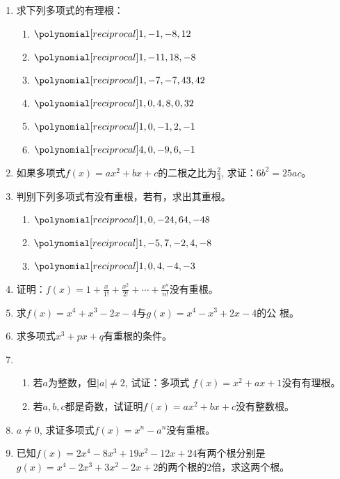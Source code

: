 \begin{enumerate}
    \item 求下列多项式的有理根：
\begin{multicols}{2}
\begin{enumerate}
    \item $\poly{1,-1,-8,12}$
    \item $\poly{1,-11,18,-8}$
    \item $\poly{1,-7,-7,43,42}$
    \item $\poly{1,0,4,8,0,32}$
    \item $\poly{1,0,-1,2,-1}$
    \item $\poly{4,0,-9,6,-1}$
\end{enumerate}
\end{multicols}

\item 如果多项式$f(x)=ax^2+bx+c$的二根之比为$\frac{2}{3}$, 求证：$6b^2=25ac$。

\item 判别下列多项式有没有重根，若有，求出其重根。
\begin{enumerate}
    \item $\poly{1,0,-24,64,-48}$
    \item $\poly{1,-5,7,-2,4,-8}$
    \item $\poly{1,0,4,-4,-3}$
\end{enumerate}

\item 证明：$f(x)=1+\frac{x}{1!}+\frac{x^2}{2!}+\cdots+\frac{x^n}{n!}$没有重根。

\item 求$f(x)=x^4+x^3-2x-4$与$g(x)=x^4-x^3+2x-4$的公
根。

\item 求多项式$x^3+px+q$有重根的条件。

\item \begin{enumerate}
    \item 若$a$为整数，但$|a|\ne 2$, 试证：多项式
$f (x) =x^2+ax+1$没有有理根。
\item 若$a,b,c$都是奇数，试证明$f(x)=ax^2+bx+c$没有整数根。
\end{enumerate}


\item $a\ne 0$, 求证多项式$f(x)=x^n-a^n$没有重根。

\item 已知$f(x)=2x^4-8x^3+19x^2-12x+24$有两个根分别是
$g(x)=x^4-2x^3+3x^2-2x+2$的两个根的2倍，求这两个根。


\end{enumerate}
